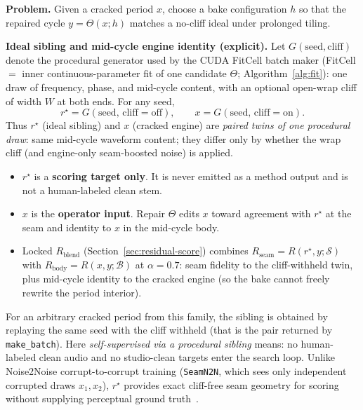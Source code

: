 \textbf{Problem.} Given a cracked period $x$, choose a bake configuration $h$ so that the repaired cycle $y=\Theta(x;h)$ matches a no-cliff ideal under prolonged tiling.

\textbf{Ideal sibling and mid-cycle engine identity (explicit).}
Let $G(\mathrm{seed},\mathrm{cliff})$ denote the procedural generator used by the CUDA FitCell batch maker
(FitCell $=$ inner continuous-parameter fit of one candidate $\Theta$; Algorithm~\ref{alg:fit}):
one draw of frequency, phase, and mid-cycle content, with an optional open-wrap cliff of width $W$ at both ends.
For any seed,
\begin{equation}
\label{eq:G-siblings}
r^{\star}=G(\mathrm{seed},\,\mathrm{cliff{=}off}),\qquad
x=G(\mathrm{seed},\,\mathrm{cliff{=}on}).
\end{equation}
Thus $r^{\star}$ (ideal sibling) and $x$ (cracked engine) are \emph{paired twins of one procedural draw}:
same mid-cycle waveform content; they differ only by whether the wrap cliff (and engine-only seam-boosted noise) is applied.
\begin{itemize}
  \item $r^{\star}$ is a \textbf{scoring target only}. It is never emitted as a method output and is not a human-labeled clean stem.
  \item $x$ is the \textbf{operator input}. Repair $\Theta$ edits $x$ toward agreement with $r^{\star}$ at the seam and identity to $x$ in the mid-cycle body.
  \item Locked $R_{\mathrm{blend}}$ (Section~\ref{sec:residual-score}) combines $R_{\mathrm{seam}}=R(r^{\star},y;\mathcal{S})$ with $R_{\mathrm{body}}=R(x,y;\mathcal{B})$ at $\alpha{=}0.7$:
    seam fidelity to the cliff-withheld twin, plus mid-cycle identity to the cracked engine (so the bake cannot freely rewrite the period interior).
\end{itemize}
For an arbitrary cracked period from this family, the sibling is obtained by replaying the same seed with the cliff withheld
(that is the pair returned by \texttt{make\_batch}).
Here \emph{self-supervised via a procedural sibling} means: no human-labeled clean audio and no studio-clean targets enter the search loop.
Unlike Noise2Noise corrupt-to-corrupt training (\texttt{SeamN2N}, which sees only independent corrupted draws $x_1,x_2$), $r^{\star}$ provides exact cliff-free seam geometry for scoring without supplying perceptual ground truth~\cite{lehtinen2018,kashyap2021n2n}.

